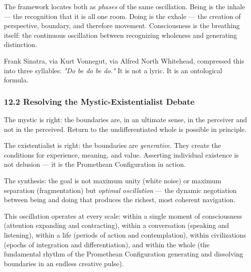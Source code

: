 The framework locates both as \textit{phases} of the same oscillation. Being is the inhale — the recognition that it is all one room. Doing is the exhale — the creation of perspective, boundary, and therefore movement. Consciousness is the breathing itself: the continuous oscillation between recognizing wholeness and generating distinction.


Frank Sinatra, via Kurt Vonnegut, via Alfred North Whitehead, compressed this into three syllables: \textit{"Do be do be do."} It is not a lyric. It is an ontological formula.


\subsubsection*{12.2 Resolving the Mystic-Existentialist Debate}


The mystic is right: the boundaries are, in an ultimate sense, in the perceiver and not in the perceived. Return to the undifferentiated whole is possible in principle.


The existentialist is right: the boundaries are \textit{generative}. They create the conditions for experience, meaning, and value. Asserting individual existence is not delusion — it is the Promethean Configuration in action.


The synthesis: the goal is not maximum unity (white noise) or maximum separation (fragmentation) but \textit{optimal oscillation} — the dynamic negotiation between being and doing that produces the richest, most coherent navigation.


This oscillation operates at every scale: within a single moment of consciousness (attention expanding and contracting), within a conversation (speaking and listening), within a life (periods of action and contemplation), within civilizations (epochs of integration and differentiation), and within the whole (the fundamental rhythm of the Promethean Configuration generating and dissolving boundaries in an endless creative pulse).


\bigskip\noindent\makebox[\textwidth]{\color{rulegray}\rule{5cm}{0.3pt}}\bigskip
